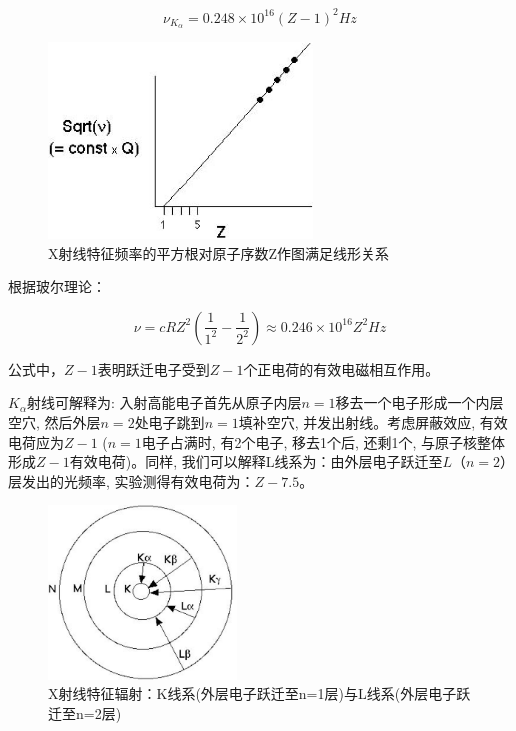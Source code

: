 \begin{equation}
\nu _{K_\alpha  }  = 0.248 \times 10^{16} (Z - 1)^2 Hz
\end{equation}


\begin{figure}[h]
\begin{center}
\includegraphics[clip,width=7cm]{BohrModel/4-5.ps}
\caption{X射线特征频率的平方根对原子序数Z作图满足线形关系}
\end{center}
\end{figure}

根据玻尔理论：

\begin{equation}
\nu  = cRZ^2 \left( {\frac{1}{{1^2 }} - \frac{1}{{2^2 }}} \right) \approx 0.246 \times 10^{16} Z^2 Hz
\end{equation}

公式中，$Z-1$表明跃迁电子受到$Z-1$个正电荷的有效电磁相互作用。

$K_\alpha $射线可解释为:
入射高能电子首先从原子内层$n=1$移去一个电子形成一个内层空穴,
然后外层$n=2$处电子跳到$n=1$填补空穴, 并发出射线。考虑屏蔽效应,
有效电荷应为$Z-1$ ($n=1$电子占满时, 有2个电子, 移去1个后, 还剩1个,
与原子核整体形成$Z-1$有效电荷)。同样,
我们可以解释L线系为：由外层电子跃迁至$L$（$n=2$）层发出的光频率,
实验测得有效电荷为：$Z-7.5$。



\begin{figure}[h]
\begin{center}
\includegraphics[clip,width=5cm]{BohrModel/4-6.ps}
\caption{X射线特征辐射：K线系(外层电子跃迁至n=1层)与L线系(外层电子跃迁至n=2层)}
\end{center}
\end{figure}



